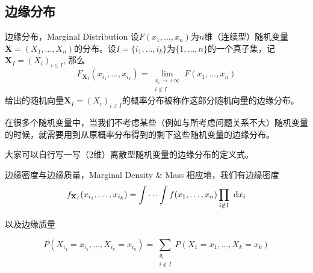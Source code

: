 
\subsection{边缘分布}


\begin{frame}

\begin{block}{边缘分布，Marginal Distribution}
设$F(x_1,\ldots,x_n)$为$n$维（连续型）随机变量$\mathbf{X} = (X_1,\ldots,X_n)$的分布。设$I = \{i_1,\ldots,i_k\}$为$\{1,\ldots,n\}$的一个真子集，记$\mathbf{X}_I = (X_i)_{i\in I}$, 那么
\[F_{\mathbf{X}_I}(x_{i_1},\ldots,x_{i_k}) = \lim\limits_{\substack{x_i\to+\infty \\ i\not\in I}} F(x_1,\ldots,x_n)\]
给出的随机向量$\mathbf{X}_I = (X_i)_{i\in I}$的概率分布被称作这部分随机向量的边缘分布。

\vspace{1em}

在很多个随机变量中，当我们不考虑某些（例如与所考虑问题关系不大）随机变量的时候，就需要用到从原概率分布得到的剩下这些随机变量的边缘分布。

\vspace{1em}

大家可以自行写一写（$2$维）离散型随机变量的边缘分布的定义式。
\end{block}

\end{frame}


\begin{frame}

\begin{block}{边缘密度与边缘质量，Marginal Density \& Mass}
相应地，我们有边缘密度
\[f_{\mathbf{X}_I}(x_{i_1},\ldots,x_{i_k}) = \idotsint f(x_1,\ldots,x_n) \prod\limits_{i\not\in I} ~ \mathrm{d}x_i\]

以及边缘质量

\[P(X_{i_1}=x_{i_1},\ldots,X_{i_k}=x_{i_k}) = \sum\limits_{\substack{y_i\\i\not\in I}} P(X_1=x_1,\ldots,X_k=x_k) \]
\end{block}

\end{frame}


